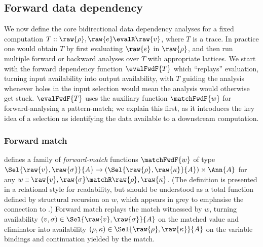 \subsection{Forward data dependency}
\label{sec:data-dependencies:analyses:fwd}

We now define the core bidirectional data dependency analyses for a fixed computation $T :: \raw{\rho}, \raw{e} \evalR \raw{v}$, where $T$ is a trace. In practice one would obtain $T$ by first evaluating $\raw{e}$ in $\raw{\rho}$, and then run multiple forward or backward analyses over $T$ with appropriate lattices. We start with the forward dependency function $\evalFwdF{T}$ which ``replays'' evaluation, turning input availability into output availability, with $T$ guiding the analysis whenever holes in the input selection would mean the analysis would otherwise get stuck. $\evalFwdF{T}$ uses the auxiliary function $\matchFwdF{w}$ for forward-analysing a pattern-match; we explain this first, as it introduces the key idea of a selection as identifying the data available to a downstream computation.



\subsubsection{Forward match}
\label{sec:data-dependencies:analyses:fwd:pattern-match}

 defines a family of \emph{forward-match} functions $\matchFwdF{w}$ of type $\Sel{\raw{v}, \raw{\sigma}}{A} \to (\Sel{\raw{\rho}, \raw{\kappa}}{A}) \times \Ann{A}$ for any $w :: \raw{v}, \raw{\sigma} \matchR \raw{\rho}, \raw{\kappa}$. (The definition is presented in a relational style for readability, but should be understood as a total function defined by structural recursion on $w$, which appears in grey to emphasise the connection to .) Forward match replays the match witnessed by $w$, turning availability $(v,\sigma) \in \Sel{\raw{v},\raw{\sigma}}{A}$ on the matched value and eliminator into availability $(\rho,\kappa) \in \Sel{\raw{\rho},{\raw{\kappa}}}{A}$ on the variable bindings and continuation yielded by the match.

